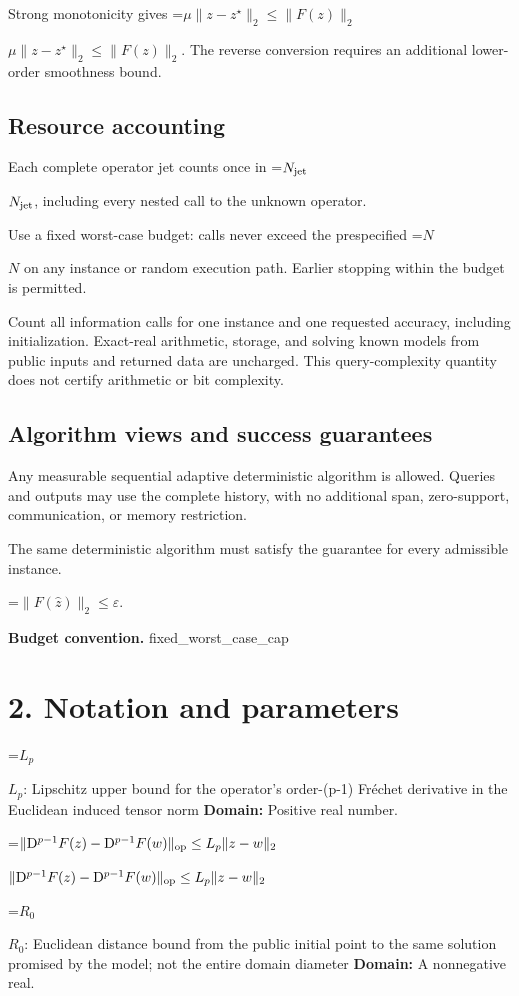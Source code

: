 \documentclass[10pt,a4paper]{article}
\newcommand{\AtlasMath}[1]{\par\begingroup\centering\setbox0=\hbox{$\displaystyle #1$}\ifdim\wd0>1.4\linewidth\typeout{ATLAS WIDE FORMULA: \the\wd0}\fi\ifdim\wd0>\linewidth\resizebox{\linewidth}{!}{\box0}\else\box0\fi\par\endgroup}
\newcommand{\AtlasInlineMath}[1]{\begingroup\setbox0=\hbox{$#1$}\ifdim\wd0>.4\linewidth\endgroup\AtlasMath{#1}\else\endgroup$#1$\fi}
\begin{document}
Strong monotonicity gives \AtlasInlineMath{\mu\|z-z^\star\|_2\le\|F(z)\|_2}. The reverse conversion requires an additional lower-order smoothness bound.

\subsection{Resource accounting}
Each complete operator jet counts once in \AtlasInlineMath{N_{\rm jet}}, including every nested call to the unknown operator.

Use a fixed worst-case budget: calls never exceed the prespecified \AtlasInlineMath{N} on any instance or random execution path. Earlier stopping within the budget is permitted.

Count all information calls for one instance and one requested accuracy, including initialization. Exact-real arithmetic, storage, and solving known models from public inputs and returned data are uncharged. This query-complexity quantity does not certify arithmetic or bit complexity.

\subsection{Algorithm views and success guarantees}
Any measurable sequential adaptive deterministic algorithm is allowed. Queries and outputs may use the complete history, with no additional span, zero-support, communication, or memory restriction.

The same deterministic algorithm must satisfy the guarantee for every admissible instance.


\AtlasMath{\|F(\widehat{z})\|_2\le\varepsilon.}


\textbf{Budget convention.} fixed\_worst\_case\_cap

\section{2. Notation and parameters}
\AtlasInlineMath{L_p}: Lipschitz upper bound for the operator's order-(p-1) Fréchet derivative in the Euclidean induced tensor norm \textbf{Domain:} Positive real number.

\AtlasInlineMath{\|\mathrm D^{p-1}F(z)-\mathrm D^{p-1}F(w)\|_{\rm op}\le L_p\|z-w\|_2}

\AtlasInlineMath{R_0}: Euclidean distance bound from the public initial point to the same solution promised by the model; not the entire domain diameter \textbf{Domain:} A nonnegative real.
\end{document}
